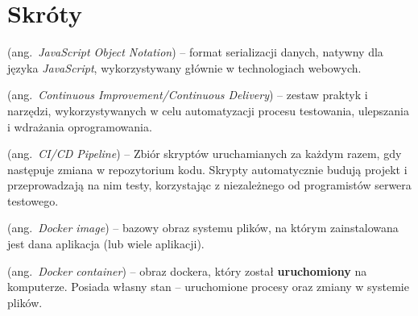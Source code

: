 \chapter*{Skróty}\mbox{}
\label{sec:skroty}
\noindent
\begin{description}[labelwidth=*]
  \item [JSON] (ang.\ \emph{JavaScript Object Notation}) %
      -- format serializacji danych, natywny dla języka \mbox{\textit{JavaScript}},
      wykorzystywany głównie w technologiach webowych.
  \item [CI/CD] (ang.\ \emph{Continuous Improvement/Continuous Delivery})
      -- zestaw praktyk i narzędzi, wykorzystywanych w celu automatyzacji procesu
      testowania, ulepszania i wdrażania oprogramowania.
 \item [Potok \textit{CI/CD}] (ang.\ \emph{CI/CD Pipeline})
      -- Zbiór skryptów uruchamianych za każdym razem,
        gdy następuje zmiana w repozytorium kodu. Skrypty automatycznie budują
        projekt i przeprowadzają na nim testy, korzystając z niezależnego
        od programistów serwera testowego.
  \item [Obraz dockera] (ang.\ \emph{Docker image}) -- bazowy obraz systemu plików,
        na którym zainstalowana jest dana aplikacja (lub wiele aplikacji).
  \item [Kontener dockera] (ang.\ \emph{Docker container}) -- obraz dockera,
        który został \textbf{uruchomiony} na komputerze. Posiada własny stan -- 
        uruchomione procesy oraz zmiany w systemie \mbox{plików}.
\end{description}
